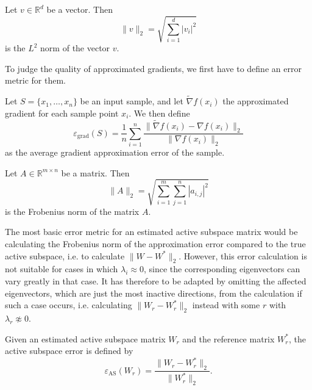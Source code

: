 \documentclass[
  a4paper,  %
  twoside,  %
  bibliography=totoc,
  headsepline,
  cleardoublepage=empty,
  parskip=half,
  draft=false
]{scrbook}
\begin{document}
\begin{definition}[$L^2$ norm]
Let $v \in \mathds{R}^{d}$ be a vector. Then
\begin{equation}
\| v\|_2=\sqrt{\sum_{i=1}^d |v_{i}|^2}
\nonumber
\end{equation}
is the $L^2$ norm of the vector $v$.
\end{definition}

To judge the quality of approximated gradients, we first have to define an error metric for them.

\begin{definition}
Let $S=\{x_1, \dots, x_n\}$ be an input sample, and let $\widetilde{\nabla} f(x_i)$ the approximated gradient for each sample point $x_i$. We then define
\begin{equation}
\varepsilon_{\text{grad}}(S)=\frac{1}{n} \sum_{i=1}^n \frac{\| \widetilde{\nabla} f(x_i) - \nabla f(x_i) \|_2}{\| \nabla f(x_i) \|_2}
\nonumber
\end{equation}
as the average gradient approximation error of the sample.
\end{definition}

\begin{definition}
Let $A \in \mathds{R}^{m \times n}$ be a matrix. Then
\begin{equation}
\| A\|_2=\sqrt{\sum_{i=1}^m \sum_{j=1}^n |a_{i,j}|^2}
\nonumber
\end{equation}
is the Frobenius norm of the matrix $A$.
\end{definition}

The most basic error metric for an estimated active subspace matrix would be calculating the Frobenius norm of the approximation error compared to the true active subspace, i.e. to calculate $\| W - W^\ast \|_2$.
However, this error calculation is not suitable for cases in which $\lambda_i \approx 0$, since the corresponding eigenvectors can vary greatly in that case.
It has therefore to be adapted by omitting the affected eigenvectors, which are just the most inactive directions, from the calculation if such a case occurs, i.e. calculating $\| W_r - W_r^\ast \|_2$ instead with some $r$ with $\lambda_r \napprox 0$.

\begin{definition}
Given an estimated active subspace matrix $W_r$ and the reference matrix $W_r^*$, the
active subspace error is defined by
\begin{equation}
\varepsilon_{\text{AS}}(W_r)=\frac{\| W_r - W_r^* \|_2}{\| W_r^* \|_2}.
\nonumber
\end{equation}
\end{definition}
\end{document}
